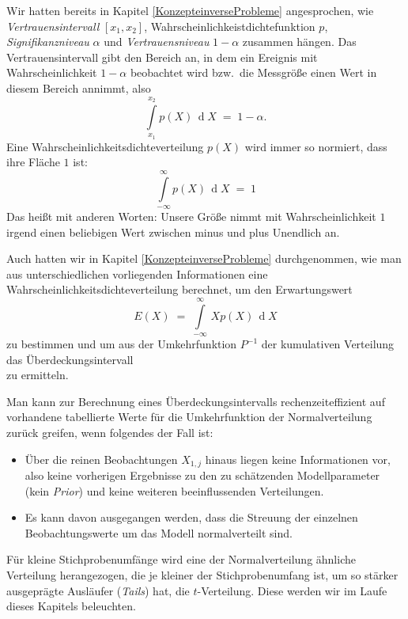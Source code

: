 Wir hatten bereits in Kapitel \ref{KonzepteinverseProbleme} angesprochen, wie
\textsl{Vertrauensintervall} $[x_1, x_2]$, Wahrscheinlichkeistdichtefunktion $p$,
\textsl{Signifikanzniveau} $\alpha$ und \textsl{Vertrauensniveau} $1-\alpha$ zusammen hängen.
Das Vertrauensintervall gibt den Bereich an, in dem ein Ereignis mit 
Wahrscheinlichkeit $1-\alpha$ beobachtet wird bzw.\ die Messgröße einen Wert in diesem Bereich
annimmt, also
\begin{equation}
\int\limits_{x_1}^{x_2} p(X) \, \operatorname{d} X \; = \; 1 - \alpha .
\end{equation}
Eine Wahrscheinlichkeitsdichteverteilung $p(X)$
wird immer so normiert, dass ihre Fläche $1$ ist:
\begin{equation}
\int\limits_{-\infty}^\infty p(X) \, \operatorname{d} X \; = \; 1
\end{equation}
Das heißt mit anderen Worten:
Unsere Größe nimmt mit Wahrscheinlichkeit $1$ irgend einen beliebigen
Wert zwischen minus und plus Unendlich an.

Auch hatten wir in Kapitel \ref{KonzepteinverseProbleme} durchgenommen, wie man aus unterschiedlichen vorliegenden
Informationen eine Wahrscheinlichkeitsdichteverteilung berechnet, um den
Erwartungswert
\begin{equation}
E(X) \; = \; \int\limits_{-\infty}^\infty \, X  p(X) \, \operatorname{d} X
\end{equation}
zu bestimmen und um aus der Umkehrfunktion $P^{-1}$ der kumulativen Verteilung
das Über\-deck\-ungs\-intervall 
\begin{equation}
[P^{-1}(\frac{\alpha}{2}), P^{-1}(1-\frac{\alpha}{2})]
\end{equation}
zu ermitteln.

Man kann zur Berechnung eines Überdeckungsintervalls
rechenzeiteffizient auf vorhandene tabellierte Werte für
die Umkehrfunktion der Normalverteilung zurück greifen, wenn
folgendes der Fall ist:
\begin{itemize}
\item Über die reinen Beobachtungen $X_{1,j}$ hinaus liegen keine
Informationen vor, also keine vorherigen Ergebnisse zu den zu
schätzenden Modellparameter (kein \textsl{Prior})
und keine weiteren beeinflussenden Verteilungen. 
\item Es kann davon ausgegangen werden, dass die Streuung der
einzelnen Beobachtungswerte um das Modell
normalverteilt sind.
\end{itemize}
Für kleine
Stichprobenumfänge wird eine der Normalverteilung ähnliche Verteilung
herangezogen, die je kleiner der Stichprobenumfang ist, um so stärker ausgeprägte
Ausläufer (\textsl{Tails}) hat, die $t$-Verteilung. Diese werden wir im Laufe
dieses Kapitels beleuchten.

